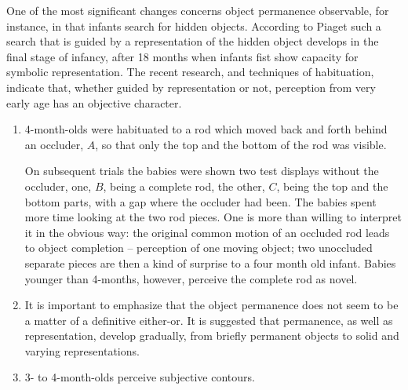 \pa\label{sub:psychexb} One of the most significant changes concerns object
permanence observable, for instance, in that infants search for hidden objects.
According to Piaget such a search that is
guided by a representation of the hidden object develops in the final stage of
infancy, after 18 months when infants fist show capacity for symbolic
representation. The recent research, and techniques of habituation, indicate
that, whether guided by representation or not, perception from very early age
has an objective character.
\begin{enumerate}\MyLPar
\item 4-month-olds were habituated to a rod which moved back and forth behind an
  occluder, $A$, so that only the top and the bottom of the rod was visible.
\begin{center}
\epsfxsize=8cm
\end{center}
On subsequent trials the babies were shown two test displays without the
occluder, one, $B$, being a complete rod, the other, $C$, being the top and the
bottom parts, with a gap where the occluder had been. The babies spent more time
looking at the two rod pieces. One is more than willing to
interpret it in the obvious way: the original common motion of an occluded rod
leads to object completion -- perception of one moving object; two unoccluded
separate pieces are then a kind of surprise to a four month old infant.  Babies
younger than 4-months, however, perceive the complete rod as novel.
\item It is important to emphasize that the object permanence does not seem to
  be a matter of a definitive either-or. It is suggested
  that permanence, as well as representation, develop gradually, from briefly
  permanent objects to solid and varying representations.
\item 3- to 4-month-olds perceive subjective contours.
%
\begin{center}
\epsfxsize=12cm

\end{center}
\end{enumerate}
